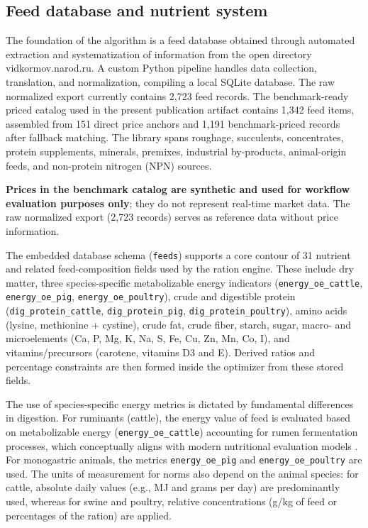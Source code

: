 \documentclass[a4paper,fleqn]{cas-sc}
\begin{document}
\subsection{Feed database and nutrient system}\label{subsec:database}

The foundation of the algorithm is a feed database obtained through automated extraction and systematization of information from the open directory vidkormov.narod.ru. A custom Python pipeline handles data collection, translation, and normalization, compiling a local SQLite database. The raw normalized export currently contains 2,723 feed records. The benchmark-ready priced catalog used in the present publication artifact contains 1,342 feed items, assembled from 151 direct price anchors and 1,191 benchmark-priced records after fallback matching. The library spans roughage, succulents, concentrates, protein supplements, minerals, premixes, industrial by-products, animal-origin feeds, and non-protein nitrogen (NPN) sources.

\textbf{Prices in the benchmark catalog are synthetic and used for workflow evaluation purposes only}; they do not represent real-time market data. The raw normalized export (2,723 records) serves as reference data without price information.

The embedded database schema (\texttt{feeds}) supports a core contour of 31 nutrient and related feed-composition fields used by the ration engine. These include dry matter, three species-specific metabolizable energy indicators (\texttt{energy\_oe\_cattle}, \texttt{energy\_oe\_pig}, \texttt{energy\_oe\_poultry}), crude and digestible protein (\texttt{dig\_protein\_cattle}, \texttt{dig\_protein\_pig}, \texttt{dig\_protein\_poultry}), amino acids (lysine, methionine + cystine), crude fat, crude fiber, starch, sugar, macro- and microelements (Ca, P, Mg, K, Na, S, Fe, Cu, Zn, Mn, Co, I), and vitamins/precursors (carotene, vitamins D3 and E). Derived ratios and percentage constraints are then formed inside the optimizer from these stored fields.

The use of species-specific energy metrics is dictated by fundamental differences in digestion. For ruminants (cattle), the energy value of feed is evaluated based on metabolizable energy (\texttt{energy\_oe\_cattle}) accounting for rumen fermentation processes, which conceptually aligns with modern nutritional evaluation models \citep{sauvant2018, nASEM2021}. For monogastric animals, the metrics \texttt{energy\_oe\_pig} and \texttt{energy\_oe\_poultry} are used. The units of measurement for norms also depend on the animal species: for cattle, absolute daily values (e.g., MJ and grams per day) are predominantly used, whereas for swine and poultry, relative concentrations (g/kg of feed or percentages of the ration) are applied.
\end{document}
